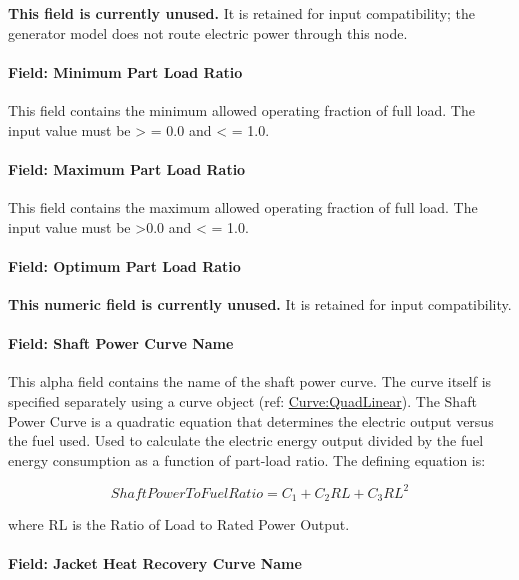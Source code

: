 \textbf{This field is currently unused.} It is retained for input compatibility; the generator model does not route electric power through this node.

\paragraph{Field: Minimum Part Load Ratio}\label{field-minimum-part-load-ratio}

This field contains the minimum allowed operating fraction of full load. The input value must be \textgreater{} = 0.0 and \textless{} = 1.0.

\paragraph{Field: Maximum Part Load Ratio}\label{field-maximum-part-load-ratio}

This field contains the maximum allowed operating fraction of full load. The input value must be \textgreater{}0.0 and \textless{} = 1.0.

\paragraph{Field: Optimum Part Load Ratio}\label{field-optimum-part-load-ratio}

\textbf{This numeric field is currently unused.} It is retained for input compatibility.

\paragraph{Field: Shaft Power Curve Name}\label{field-shaft-power-curve-name}

This alpha field contains the name of the shaft power curve. The curve itself is specified separately using a curve object (ref: \hyperref[curvequadlinear]{Curve:QuadLinear}). The Shaft Power Curve is a quadratic equation that determines the electric output versus the fuel used. Used to calculate the electric energy output divided by the fuel energy consumption as a function of part-load ratio. The defining equation is:

\begin{equation}
ShaftPowerToFuelRatio = {C_1} + {C_2}RL + {C_3}R{L^2}
\end{equation}

where RL is the Ratio of Load to Rated Power Output.

\paragraph{Field: Jacket Heat Recovery Curve Name}\label{field-jacket-heat-recovery-curve-name}

